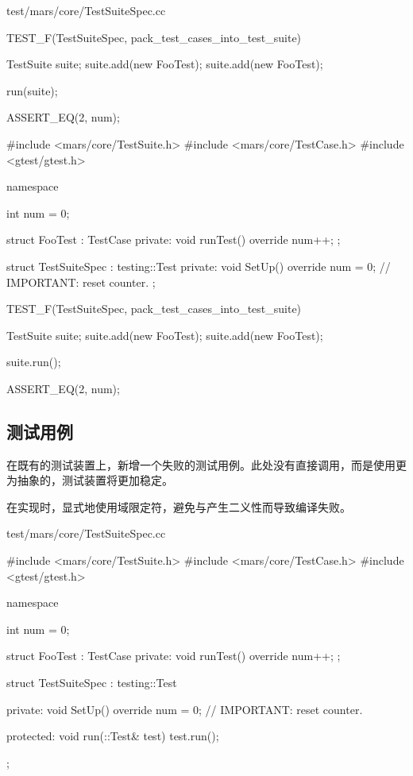 \begin{content}
\begin{diff}{test/mars/core/TestSuiteSpec.cc}
\begin{minicpp}
TEST_F(TestSuiteSpec, pack_test_cases_into_test_suite) {
  TestSuite suite;
  suite.add(new FooTest);
  suite.add(new FooTest);

  run(suite);

  ASSERT_EQ(2, num);
}
 \end{minicpp}
\tcblower
 \begin{minicpp}
#include <mars/core/TestSuite.h>
#include <mars/core/TestCase.h>
#include <gtest/gtest.h>

namespace {
  int num = 0;

  struct FooTest : TestCase {
  private:
    void runTest() override {
      num++;
    }
  };

  struct TestSuiteSpec : testing::Test {
  private:
    void SetUp() override {
      num = 0;  // IMPORTANT: reset counter.
    }
  };
}

TEST_F(TestSuiteSpec, pack_test_cases_into_test_suite) {
  TestSuite suite;
  suite.add(new FooTest);
  suite.add(new FooTest);

  suite.run();

  ASSERT_EQ(2, num);
}
 \end{minicpp}
\end{diff}

\subsection{测试用例}

在既有的测试装置上，新增一个失败的测试用例。此处没有直接调用，而是使用更为抽象的，测试装置将更加稳定。

在实现时，显式地使用域限定符，避免与产生二义性而导致编译失败。

\begin{nodiff}{test/mars/core/TestSuiteSpec.cc}
 \begin{c++}
#include <mars/core/TestSuite.h>
#include <mars/core/TestCase.h>
#include <gtest/gtest.h>

namespace {
  int num = 0;

  struct FooTest : TestCase {
  private:
    void runTest() override {
      num++;
    }
  };

  struct TestSuiteSpec : testing::Test {
  private:
    void SetUp() override {
      num = 0;  // IMPORTANT: reset counter.
    }

  protected:
    void run(::Test& test) {
      test.run();
    }
  };
}


\end{c++}
\end{nodiff}
\end{content}
